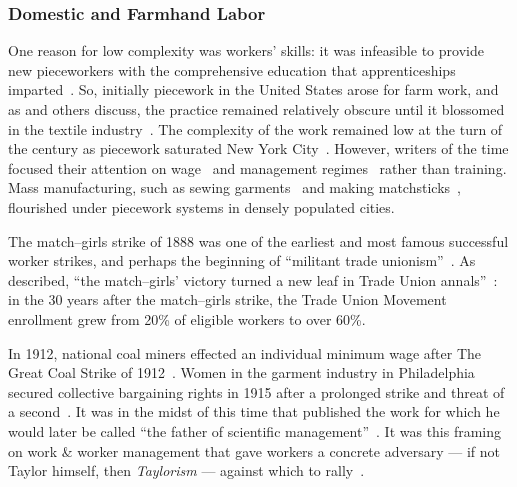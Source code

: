 \documentclass[trackingWork]{subfiles}
\begin{document}
\subsubsection{Domestic and Farmhand Labor}
One reason for low complexity was workers' skills:
it was infeasible to provide new pieceworkers with the comprehensive education
that apprenticeships imparted~\cite{hart2013rise}.
So, initially piecework in the United States arose for farm work, and as
\citeauthor{hughRaynbirdTaskWork} and others discuss,
the practice remained relatively obscure until
it blossomed in the textile industry~\cite{hughRaynbirdTaskWork}.
The complexity of the work remained low at the turn of
the  century as piecework saturated New York City~\cite{riisOtherSideLives}.
However, writers of the time focused their attention on
wage~\cite{burton1899commercial} and
management regimes~\cite{norton1900textile}
rather than training.
Mass manufacturing,
such as sewing garments~\cite{riisOtherSideLives} and making matchsticks~\cite{10.2307/3827491},
flourished under piecework systems in densely populated cities.

The match--girls strike of 1888 was one of the earliest and most famous successful worker strikes,
and perhaps the beginning of ``militant trade unionism''~\cite{10.2307/3827491}.
As \citeauthor{weyer1894history} described,
``the match--girls' victory turned a new leaf in Trade Union annals''~\cite{weyer1894history}: in the 30 years after the match--girls strike,
the Trade Union Movement enrollment grew from 20\% of eligible workers to over 60\%.

In 1912, national coal miners effected an individual minimum wage after The Great Coal Strike of 1912~\cite{10.2307/2221944}.
Women in the garment industry in Philadelphia secured collective bargaining rights in 1915 after a prolonged strike and threat of a second~\cite{10.2307/41829256}.
It was in the midst of this time that \citeauthor{taylor1914principles} published
the work for which he would later be called ``the father of scientific management''~\cite{RePEc:mtp:titles:0262612062}.
It was this framing on work \& worker management that gave workers a concrete adversary
--- if not Taylor himself, then \textit{Taylorism}  ---
against which to rally~\cite{jacoby1983union,parker1920casual}.
\end{document}
